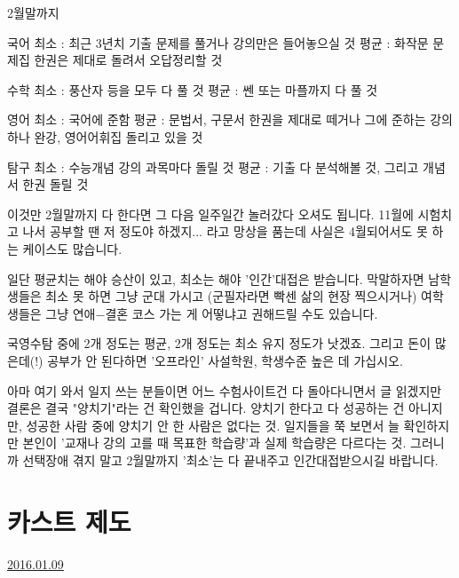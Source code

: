 \vspace{5mm}

2월말까지
\vspace{5mm}

국어
최소 : 최근 3년치 기출 문제를 풀거나 강의만은 들어놓으실 것
평균 : 화작문 문제집 한권은 제대로 돌려서 오답정리할 것
\vspace{5mm}

수학
최소 : 풍산자 등을 모두 다 풀 것
평균 : 쎈 또는 마플까지 다 풀 것
\vspace{5mm}

영어
최소 : 국어에 준함
평균 : 문법서, 구문서 한권을 제대로 떼거나 그에 준하는 강의 하나 완강, 영어어휘집 돌리고 있을 것
\vspace{5mm}

탐구
최소 : 수능개념 강의 과목마다 돌릴 것
평균 : 기출 다 분석해볼 것, 그리고 개념서 한권 돌릴 것
\vspace{5mm}

이것만 2월말까지 다 한다면 그 다음 일주일간 놀러갔다 오셔도 됩니다.
11월에 시험치고 나서 공부할 땐 저 정도야 하겠지... 라고 망상을 품는데
사실은 4월되어서도 못 하는 케이스도 많습니다.
\vspace{5mm}

일단 평균치는 해야 승산이 있고, 최소는 해야 '인간'대접은 받습니다.
막말하자면 남학생들은 최소 못 하면 그냥 군대 가시고 (군필자라면 빡센 삶의 현장 찍으시거나)
여학생들은 그냥 연애$-$결혼 코스 가는 게 어떻냐고 권해드릴 수도 있습니다.
\vspace{5mm}

국영수탐 중에 2개 정도는 평균, 2개 정도는 최소 유지 정도가 낫겠죠.
그리고 돈이 많은데(!) 공부가 안 된다하면 '오프라인' 사설학원, 학생수준 높은 데 가십시오.
\vspace{5mm}

아마 여기 와서 일지 쓰는 분들이면 어느 수험사이트건 다 돌아다니면서 글 읽겠지만
결론은 결국 "양치기"라는 건 확인했을 겁니다. 양치기 한다고 다 성공하는 건 아니지만, 성공한 사람 중에 양치기 안 한 사람은 없다는 것.
일지들을 쭉 보면서 늘 확인하지만 본인이 '교재나 강의 고를 때 목표한 학습량'과 실제 학습량은 다르다는 것.
그러니까 선택장애 겪지 말고 2월말까지 '최소'는 다 끝내주고 인간대접받으시길 바랍니다.
\vspace{5mm}








\section{카스트 제도}
\href{https://www.kockoc.com/Apoc/581753}{2016.01.09}

